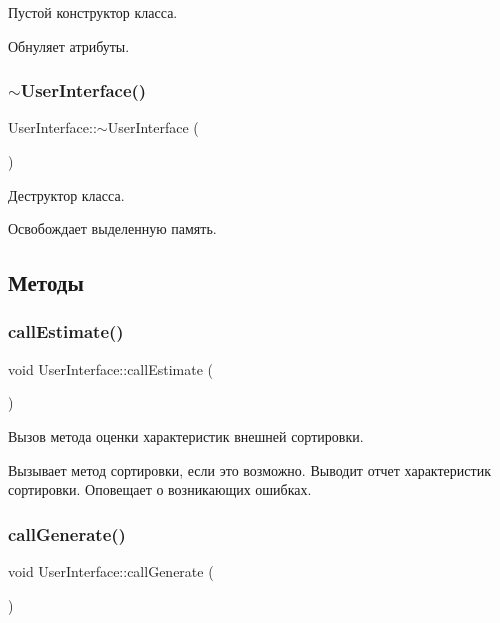 Пустой конструктор класса. 

Обнуляет атрибуты. \hypertarget{class_user_interface_ae588b2ff1711a016dd4c6fc5002c0841}{}\label{class_user_interface_ae588b2ff1711a016dd4c6fc5002c0841} 
\subsubsection{\texorpdfstring{$\sim$\+User\+Interface()}{~UserInterface()}}
{\footnotesize\ttfamily User\+Interface\+::$\sim$\+User\+Interface (\begin{DoxyParamCaption}{ }\end{DoxyParamCaption})}



Деструктор класса. 

Освобождает выделенную память. 

\subsection{Методы}
\hypertarget{class_user_interface_a7957201b3543ea0561d48bcc0a0d329e}{}\label{class_user_interface_a7957201b3543ea0561d48bcc0a0d329e} 
\subsubsection{\texorpdfstring{call\+Estimate()}{callEstimate()}}
{\footnotesize\ttfamily void User\+Interface\+::call\+Estimate (\begin{DoxyParamCaption}{ }\end{DoxyParamCaption})\hspace{0.3cm}{\ttfamily [private]}}



Вызов метода оценки характеристик внешней сортировки. 

Вызывает метод сортировки, если это возможно. Выводит отчет характеристик сортировки. Оповещает о возникающих ошибках. \hypertarget{class_user_interface_a27c547dadfd5588d5b734e253b2e8a4a}{}\label{class_user_interface_a27c547dadfd5588d5b734e253b2e8a4a} 
\subsubsection{\texorpdfstring{call\+Generate()}{callGenerate()}}
{\footnotesize\ttfamily void User\+Interface\+::call\+Generate (\begin{DoxyParamCaption}{ }\end{DoxyParamCaption})\hspace{0.3cm}{\ttfamily [private]}}



